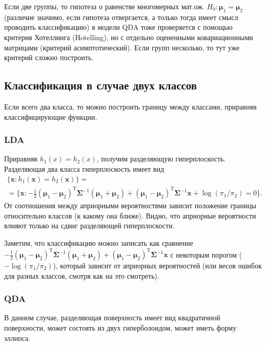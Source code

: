 \begin{note}
  Если две группы, то гипотеза о равенстве многомерных мат.ож. $H_0: \bm{\mu}_1 = \bm{\mu}_2$ (различие значимо, если гипотеза отвергается, а только тогда имеет смысл проводить классификацию) в модели QDA тоже проверяется с помощью критерия Хотеллинга (Hotelling), но с отдельно оцененными ковариационными матрицами (критерий асимптотический). Если групп несколько, то тут уже критерий сложно построить.
\end{note}

\newpage
\subsection{Классификация в случае двух классов}
Если всего два класса, то можно построить границу между классами, приравняв классифицирующие функции.
\subsubsection{LDA} %
Приравняв $h_1(x)= h_2(x)$, получим разделяющую гиперплоскость.
Разделяющая два класса гиперплоскость имеет вид
\begin{multline*}
  \{\mathbf{x} : h_1(\mathbf{x}) = h_2(\mathbf{x})\} =\\ = \{\mathbf{x} : -\frac{1}{2} (\bm{\mu}_1 - \bm{\mu}_2)^\mathrm{T} \mathbf{\bm{\Sigma}}^{-1}(\bm{\mu}_1 + \bm{\mu}_2) + (\bm{\mu}_1 - \bm{\mu}_2)^\mathrm{T} \mathbf{\bm{\Sigma}}^{-1}\mathbf{x} + \log(\pi_1/\pi_2) = 0\}.
\end{multline*}
От соотношения между априорными вероятностями зависит положение границы относительно классов (к какому она ближе).
Видно, что априорные вероятности влияют только на сдвиг разделяющей гиперплоскости.

Заметим, что классификацию можно записать как сравнение $-\frac{1}{2} (\bm{\mu}_1 - \bm{\mu}_2)^\mathrm{T} \mathbf{\bm{\Sigma}}^{-1}(\bm{\mu}_1 + \bm{\mu}_2) + (\bm{\mu}_1 - \bm{\mu}_2)^\mathrm{T} \mathbf{\bm{\Sigma}}^{-1}\mathbf{x}$ с некоторым порогом ($-\log(\pi_1/\pi_2)$), который зависит от априорных вероятностей
(или весов ошибок для разных классов, смотря как на это смотреть).

\subsubsection{QDA} %
	В данном случае, разделяющая поверхность имеет вид квадратичной поверхности, может состоять из двух гиперболоидом,
может иметь форму эллипса.


